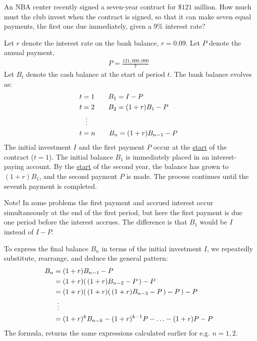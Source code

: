 \documentclass[12pt]{article}
\begin{document}
\begin{enumerate}
\nopagebreak

An NBA center recently signed a seven-year contract for $\$121$ million. How much must the club invest when the contract is signed, so that it can make seven equal payments, the first one due immediately, given a $9\%$ interest rate? 

\begin{answer}
Let $r$ denote the interest rate on the bank balance, $r=0.09$. Let $P$ denote the annual payment, 
\begin{align*}
P = \frac{121,000,000}{7}
\end{align*}
Let $B_{t}$ denote the cash balance at the start of period $t$. The bank balance evolves as:
\begin{align*}
t & = 1 \qquad B_{1} = I - P\\
t & = 2 \qquad B_{2} = (1+r)B_{1} - P\\
  &\vdotswithin{=} \\
t & = n \qquad B_{n} = (1+r)B_{n-1} - P
\end{align*}
The initial investment $I$ and the first payment $P$ occur at the \underline{start} of the contract ($t=1$). The initial balance $B_{1}$ is immediately placed in an interest-paying account. By the \underline{start} of the second year, the balance has grown to $(1+r)B_{1}$, and the second payment $P$ is made. The process continues until the seventh payment is completed.

Note! In some problems the first payment and accrued interest occur simultaneously at the end of the first period, but here the first payment is due one period before the interest accrues. The difference is that $B_{1}$ would be $I$ instead of $I-P$. 

To express the final balance $B_{n}$ in terms of the initial investment $I$, we repeatedly substitute, rearrange, and deduce the general pattern:
\begin{align*}
B_{n} & = (1+r)B_{n-1} - P\\
      & = (1+r)(\, (1+r)B_{n-2} - P \,) - P\\
      & = (1+r)(\,(1+r)(\,(1+r)B_{n-3} - P \,) - P \,) - P\\
      &\vdotswithin{=}\\
      & = (1+r)^{k}B_{n-k} - (1+r)^{k-1}P - \ldots  - (1+r)P - P
\end{align*}
The formula, returns the same expressions calculated earlier for e.g. $n=1,2$. 


\end{answer}
\end{enumerate}
\end{document}
